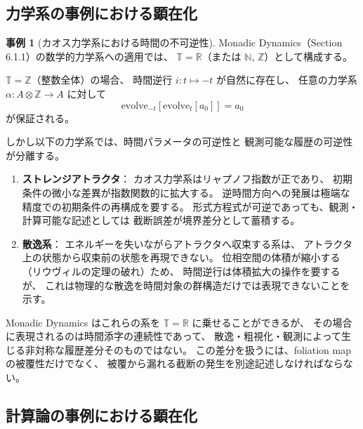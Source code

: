 \documentclass[11pt,a4paper]{ltjsarticle}
\theoremstyle{definition}
\newtheorem{example}{事例}[section]
\begin{document}
\subsection{力学系の事例における顕在化}

\begin{example}[カオス力学系における時間の不可逆性]
Monadic Dynamics（Section 6.1.1）の数学的力学系への適用では、
$\mathbb{T} = \mathbb{R}$（または $\mathbb{N}$, $\mathbb{Z}$）として構成する。

$\mathbb{T} = \mathbb{Z}$（整数全体）の場合、
時間逆行 $i: t \mapsto -t$ が自然に存在し、
任意の力学系 $\alpha: A \otimes \mathbb{Z} \to A$ に対して
\[
\mathrm{evolve}_{-t}[\mathrm{evolve}_t[a_0]] = a_0
\]
が保証される。

しかし以下の力学系では、時間パラメータの可逆性と
観測可能な履歴の可逆性が分離する。

\begin{enumerate}
\item \textbf{ストレンジアトラクタ}：
  カオス力学系はリャプノフ指数が正であり、
  初期条件の微小な差異が指数関数的に拡大する。
  逆時間方向への発展は極端な精度での初期条件の再構成を要する。
  形式方程式が可逆であっても、観測・計算可能な記述としては
  截断誤差が境界差分として蓄積する。

\item \textbf{散逸系}：
  エネルギーを失いながらアトラクタへ収束する系は、
  アトラクタ上の状態から収束前の状態を再現できない。
  位相空間の体積が縮小する（リウヴィルの定理の破れ）ため、
  時間逆行は体積拡大の操作を要するが、
  これは物理的な散逸を時間対象の群構造だけでは表現できないことを示す。
\end{enumerate}

Monadic Dynamics はこれらの系を $\mathbb{T} = \mathbb{R}$ に乗せることができるが、
その場合に表現されるのは時間添字の連続性であって、
散逸・粗視化・観測によって生じる非対称な履歴差分そのものではない。
この差分を扱うには、foliation map の被覆性だけでなく、
被覆から漏れる截断の発生を別途記述しなければならない。
\end{example}

\subsection{計算論の事例における顕在化}
\end{document}
